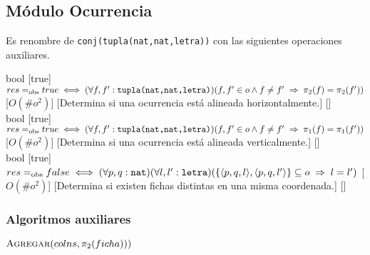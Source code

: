 \subsection{Módulo Ocurrencia}
Es renombre de \texttt{conj(tupla(nat,nat,letra))} con las siguientes operaciones auxiliares.\\
\begin{adjustwidth}{3em}{0em}
\begin{operaciones}
  {
  }{bool}
  [true]
  {$res\igobs true\iff(\forall f,f':\texttt{tupla(nat,nat,letra)})(f,f'\in o\land f\neq f'\implies \pi_{2}(f)=\pi_{2}(f'))$}
  [$O(\#o^{2})$]
  [Determina si una ocurrencia está alineada horizontalmente.]
  [\falta]\\

  \noindent{}
  {
  }{bool}
  [true]
  {$res\igobs true\iff(\forall f,f':\texttt{tupla(nat,nat,letra)})(f,f'\in o\land f\neq f'\implies \pi_{1}(f)=\pi_{1}(f'))$}
  [$O(\#o^{2})$]
  [Determina si una ocurrencia está alineada verticalmente.]
  [\falta]\\

  \noindent{}
  {
  }{bool}
  [true]
  {$res\igobs false\iff
      (\forall p,q:\texttt{nat})(\forall l,l':\texttt{letra})(
      \{\langle p,q,l\rangle,\langle p,q,l'\rangle\}\subseteq o\implies l=l')$}
  [$O(\#o^{2})$]
  [Determina si existen fichas distintas en una misma coordenada.]
  [\falta]
\end{operaciones}
\end{adjustwidth}

\subsubsection{Algoritmos auxiliares}
\begin{algorithm}[H]
  \begin{algorithmic}[1]
    \State{}
      \State{}
      \State$\textsc{Agregar}(colns,\pi_{2}(ficha)))$
    \EndFor
    \State{}
  \end{algorithmic}
\end{algorithm}

